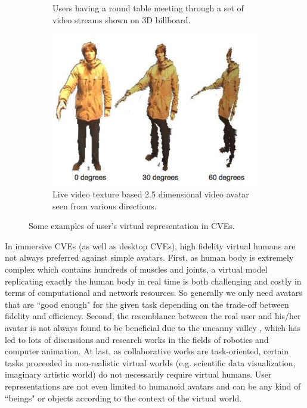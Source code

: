 \begin{figure}[htb]
\begin{subfigure}{.5\textwidth}
    \caption{Users having a round table meeting through a set of video streams shown on 3D billboard.}
    \label{fig:1_vrep:billboard}
  \end{subfigure}
  \begin{subfigure}{.5\textwidth}
    \centering
    \includegraphics[width=0.9\linewidth]{figures/ch1/rep_video_avatar}
    \caption{Live video texture based 2.5 dimensional video avatar seen from various directions.}
    \label{fig:1_vrep:video_avatar}
  \end{subfigure}
  \caption{\label{fig:1_vrep} Some examples of user's virtual representation in CVEs.}
\end{figure}

In immersive CVEs (as well as desktop CVEs), high fidelity virtual humans are not always preferred against simple avatars. First, as human body is extremely complex which contains hundreds of muscles and joints, a virtual model replicating exactly the human body in real time is both challenging and costly in terms of computational and network resources. So generally we only need avatars that are ``good enough" for the given task depending on the trade-off between fidelity and efficiency. Second, the resemblance between the real user and his/her avatar is not always found to be beneficial due to the uncanny valley \citep{Mori2012Uncanny}, which has led to lots of discussions and research works in the fields of robotics and computer animation. At last, as collaborative works are task-oriented, certain tasks proceeded in non-realistic virtual worlds (e.g. scientific data visualization, imaginary artistic world) do not necessarily require virtual humans. User representations are not even limited to humanoid avatars and can be any kind of ``beings" or objects according to the context of the virtual world.

